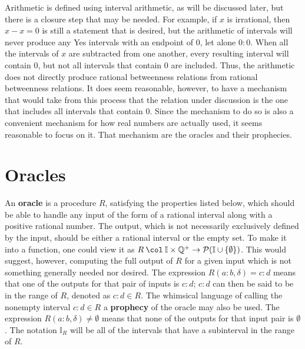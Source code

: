 \documentclass[12pt]{article}
\begin{document}
Arithmetic is defined using interval arithmetic, as will be discussed later, but there is a closure step that may be needed. For example, if $x$ is irrational, then $x - x = 0$ is still a statement that is desired, but the arithmetic of intervals will never produce any Yes intervals with an endpoint of $0$, let alone $0:0$. When all the intervals of $x$ are subtracted from one another, every resulting interval will contain 0, but not all intervals that contain 0 are included. Thus, the arithmetic does not directly produce rational betweenness relations from rational betweenness relations. It does seem reasonable, however, to have a mechanism that would take from this process that the relation under discussion is the one that includes all intervals that contain $0$. Since the mechanism to do so is also a convenient mechanism for how real numbers are actually used, it seems reasonable to focus on it. That mechanism are the oracles and their prophecies. 

\section{Oracles}

An \textbf{oracle} is a procedure $R$, satisfying the properties listed below, which should be able to handle any input of the form of a rational interval along with a positive rational number. The output, which is not necessarily exclusively defined by the input, should be either a rational interval or the empty set. To make it into a function, one could view it as $R \mathbin{\col} \mathbb{I} \times \mathbb{Q}^+ \to \mathcal{P}(\mathbb{I} \cup \{\emptyset\})$. This would suggest, however, computing the full output of $R$ for a given input which is not something generally needed nor desired. The expression $R(a:b, \delta) = c:d$ means that one of the outputs for that pair of inputs is $c:d$; $c:d$ can then be said to be in the range of $R$, denoted as $c:d \in R$. The whimsical language of calling the nonempty interval $c:d \in R$ a \textbf{prophecy} of the oracle may also be used. The expression $R(a:b, \delta) \neq \emptyset$ means that none of the outputs for that input pair is $\emptyset$. The notation $\mathbb{I}_R$ will be all of the intervals that have a subinterval in the range of $R$. 
\end{document}
